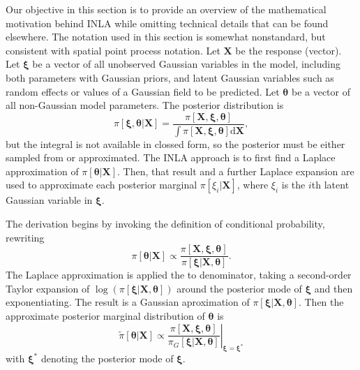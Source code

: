 \documentclass[]{interact}
\begin{document}
Our objective in this section is to provide an overview of the mathematical
motivation behind INLA while omitting technical details that can be found
elsewhere. The notation used in this section is somewhat nonstandard, but
consistent with spatial point process notation. Let \(\mathbf{X}\) be the
response (vector). Let \(\boldsymbol{\xi}\) be a vector of all unobserved
Gaussian variables in the model, including both parameters with Gaussian
priors, and latent Gaussian variables such as random effects or values of a
Gaussian field to be predicted. Let \(\boldsymbol{\theta}\) be a vector of all
non-Gaussian model parameters. The posterior distribution is
\begin{displaymath}
\pi\left[\boldsymbol{\xi}, \boldsymbol{\theta}| \mathbf{X}\right]
= \frac{\pi\left[\mathbf{X}, \boldsymbol{\xi}, \boldsymbol{\theta}\right]}
{\int \pi\left[\mathbf{X}, \boldsymbol{\xi}, \boldsymbol{\theta}\right]
\mathrm{d}\mathbf{X}},
\end{displaymath}
but the integral is not available in clossed form, so the posterior must be
either sampled from or approximated. The INLA approach is to first find a
Laplace approximation of \(\pi\left[\boldsymbol{\theta} | \mathbf{X}\right]\).
Then, that result and a further Laplace expansion are used to approximate each
posterior marginal \(\pi\left[\xi_{i}| \mathbf{X}\right]\), where \(\xi_{i}\)
is the \(i\)th latent Gaussian variable in \(\boldsymbol{\xi}\).

The derivation begins by invoking the definition of conditional probability,
rewriting
\begin{displaymath}
\pi\left[\boldsymbol{\theta} | \mathbf{X}\right]
\propto \frac{\pi\left[\mathbf{X}, \boldsymbol{\xi}, \boldsymbol{\theta}\right]}
{\pi\left[\boldsymbol{\xi} | \mathbf{X}, \boldsymbol{\theta}\right]}.
\end{displaymath}
The Laplace approximation is applied the to denominator, taking a second-order
Taylor expansion of
\(\log\left(\pi\left[\boldsymbol{\xi} | \mathbf{X}, \boldsymbol{\theta}\right]\right)\)
around the posterior mode of \(\boldsymbol{\xi}\) and then exponentiating. The
result is a Gaussian aproximation of
\(\pi\left[\boldsymbol{\xi} | \mathbf{X}, \boldsymbol{\theta}\right]\). Then
the approximate posterior marginal distribution of \(\boldsymbol{\theta}\) is
\begin{displaymath}
\tilde{\pi}\left[\boldsymbol{\theta} | \mathbf{X}\right]
\propto \left.\frac{\pi\left[\mathbf{X}, \boldsymbol{\xi}, \boldsymbol{\theta}\right]}
{\pi_{G}\left[\boldsymbol{\xi} | \mathbf{X}, \boldsymbol{\theta}\right]}
\right|_{\boldsymbol{\xi}=\boldsymbol{\xi}^{*}}
\end{displaymath}
with \(\boldsymbol{\xi}^{*}\) denoting the posterior mode of
\(\boldsymbol{\xi}\).
\end{document}
